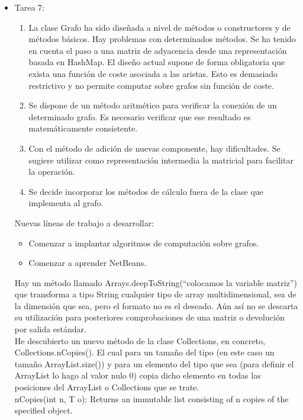 \begin{itemize}
\item Tarea 7:

\begin{enumerate}
\item La clase Grafo ha sido diseñada a nivel de métodos o constructores y de métodos básicos. Hay problemas con determinados métodos. Se ha tenido en cuenta el paso a una matriz de adyacencia desde una representación basada en HashMap. El diseño actual supone de forma obligatoria que exista una función de coste asociada a las aristas. Esto es demasiado restrictivo y no permite computar sobre grafos sin función de coste.
\item Se dispone de un método aritmético para verificar la conexión de un determinado grafo. Es necesario verificar que ese resultado es matemáticamente consistente.
\item Con el método de adición de nuevas componente, hay dificultades. Se sugiere utilizar como representación intermedia la matricial para facilitar la operación.
\item Se decide incorporar los métodos de cálculo fuera de la clase que implementa al grafo.
\end{enumerate}

Nuevas líneas de trabajo a desarrollar:
\begin{itemize}
\item Comenzar a implantar algoritmos de computación sobre grafos.
\item Comenzar a aprender NetBeans.
\end{itemize}

Hay un método llamado Arrays.deepToString(``colocamos la variable matriz'') que transforma a tipo String cualquier tipo de array multidimensional, sea de la dimensión que sea, pero el formato no es el deseado. Aún así no se descarta su utilización para posteriores comprobaciones de una matriz o devolución por salida estándar.\\

He descubierto un nuevo método de la clase Collections, en concreto, Collections.nCopies(). El cual para un tamaño del tipo (en este caso un tamaño ArrayList.size()) y para un elemento del tipo que sea (para definir el ArrayList lo hago al valor nulo 0) copia dicho elemento en todas las posiciones del ArrayList o Collections que se trate.\\
nCopies(int n, T o): Returns an immutable list consisting of n copies of the specified object.\\


\end{itemize}
